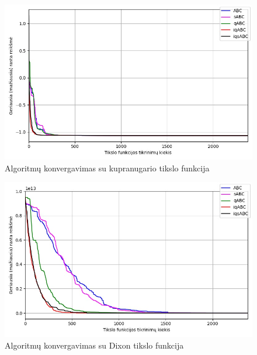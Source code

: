 \documentclass{VUMIFPSmagistrinis}
\begin{document}
\begin{landscape}
\begin{multicols}{2}
\end{multicols}
\begin{multicols}{2}

\begin{figure}[H]
    \centering
    \includegraphics[scale=0.45]{img/2kv/all_camel.jpg}
     \caption{Algoritmų konvergavimas su kupranugario tikslo funkcija}
    \label{img:kon3}
\end{figure}

\begin{figure}[H]
    \centering
    \includegraphics[scale=0.45]{img/2kv/all_dixon.jpg}
     \caption{Algoritmų konvergavimas su Dixon tikslo funkcija}
    \label{img:kon4}
\end{figure}

\end{multicols}\newpage
\begin{multicols}{2}


\end{multicols}
\end{landscape}
\end{document}
